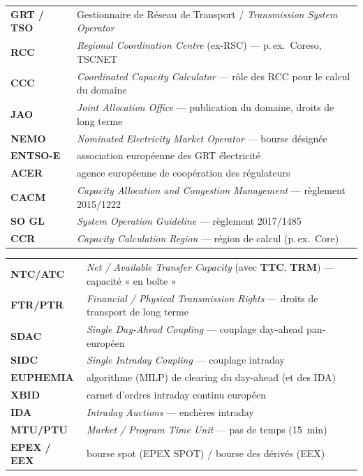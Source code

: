 \documentclass[11pt,a4paper]{article}
\begin{document}
{
\begin{tabular}{@{}p{2.6cm}@{\quad}p{11.5cm}@{}}
\textbf{GRT / TSO} & Gestionnaire de Réseau de Transport / \emph{Transmission System Operator} \\
\textbf{RCC}     & \emph{Regional Coordination Centre} (ex-RSC) — p.\,ex.\ Coreso, TSCNET \\
\textbf{CCC}     & \emph{Coordinated Capacity Calculator} — rôle des RCC pour le calcul du domaine \\
\textbf{JAO}     & \emph{Joint Allocation Office} — publication du domaine, droits de long terme \\
\textbf{NEMO}    & \emph{Nominated Electricity Market Operator} — bourse désignée \\
\textbf{ENTSO-E} & association européenne des GRT électricité \\
\textbf{ACER}    & agence européenne de coopération des régulateurs \\
\textbf{CACM}    & \emph{Capacity Allocation and Congestion Management} — règlement 2015/1222 \\
\textbf{SO GL}   & \emph{System Operation Guideline} — règlement 2017/1485 \\
\textbf{CCR}     & \emph{Capacity Calculation Region} — région de calcul (p.\,ex.\ Core) \\
\end{tabular}

\begin{tabular}{@{}p{2.6cm}@{\quad}p{11.5cm}@{}}
\textbf{NTC/ATC} & \emph{Net / Available Transfer Capacity} (avec \textbf{TTC}, \textbf{TRM}) — capacité « en boîte » \\
\textbf{FTR/PTR} & \emph{Financial / Physical Transmission Rights} — droits de transport de long terme \\
\textbf{SDAC}    & \emph{Single Day-Ahead Coupling} — couplage day-ahead pan-européen \\
\textbf{SIDC}    & \emph{Single Intraday Coupling} — couplage intraday \\
\textbf{EUPHEMIA}& algorithme (MILP) de clearing du day-ahead (et des IDA) \\
\textbf{XBID}    & carnet d'ordres intraday continu européen \\
\textbf{IDA}     & \emph{Intraday Auctions} — enchères intraday \\
\textbf{MTU/PTU} & \emph{Market / Program Time Unit} — pas de temps (15~min) \\
\textbf{EPEX / EEX} & bourse spot (EPEX SPOT) / bourse des dérivés (EEX) \\
\end{tabular}

}
\end{document}
